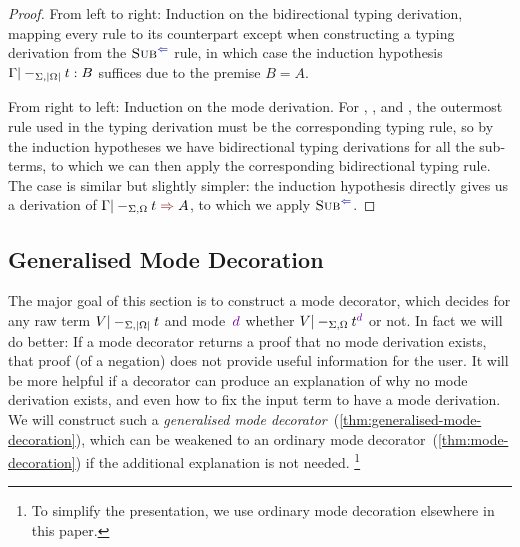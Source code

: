 \begin{proof}
From left to right:
Induction on the bidirectional typing derivation, mapping every rule to its counterpart except when constructing a typing derivation from the $\ChkRule{Sub}$ rule, in which case the induction hypothesis $\Gamma |-_{\Sigma,\left|\Omega\right|} t : B$ suffices due to the premise $B = A$.

From right to left:
Induction on the mode derivation.
For , , and , the outermost rule used in the typing derivation must be the corresponding typing rule, so by the induction hypotheses we have bidirectional typing derivations for all the sub-terms, to which we can then apply the corresponding bidirectional typing rule.
The  case is similar but slightly simpler: the induction hypothesis directly gives us a derivation of $\Gamma |-_{\Sigma,\Omega} t \syn A$, to which we apply $\ChkRule{Sub}$.
\end{proof}

\subsection{Generalised Mode Decoration}
\label{sec:mode-decoration}

The major goal of this section is to construct a mode decorator, which decides for any raw term $V |-_{\Sigma,\left|\Omega\right|} t$ and mode~$\dir d$ whether $V |-_{\Sigma,\Omega} t^\dir{d}$ or not.
In fact we will do better:
If a mode decorator returns a proof that no mode derivation exists, that proof (of a negation) does not provide useful information for the user.
It will be more helpful if a decorator can produce an explanation of why no mode derivation exists, and even how to fix the input term to have a mode derivation.
We will construct such a \emph{generalised mode decorator}~(\cref{thm:generalised-mode-decoration}), which can be weakened to an ordinary mode decorator~(\cref{thm:mode-decoration}) if the additional explanation is not needed.%
\footnote{To simplify the presentation, we use ordinary mode decoration elsewhere in this paper.}

